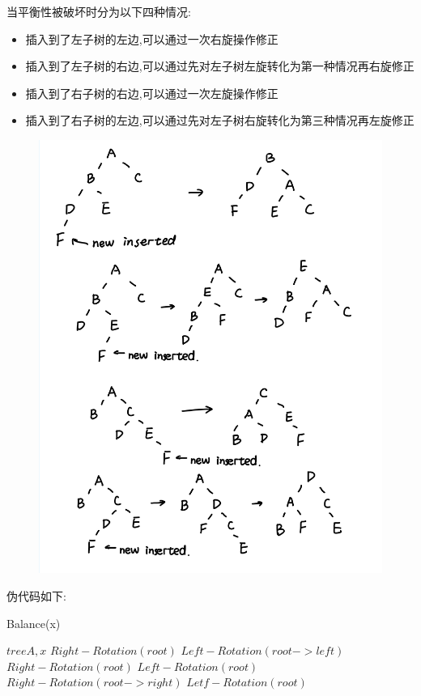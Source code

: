 \documentclass[12pt,a4paper,fontset=none]{ctexart}
\begin{document}
当平衡性被破坏时分为以下四种情况:
\begin{itemize}
	\item 插入到了左子树的左边,可以通过一次右旋操作修正
	\item 插入到了左子树的右边,可以通过先对左子树左旋转化为第一种情况再右旋修正
	\item 插入到了右子树的右边,可以通过一次左旋操作修正
	\item 插入到了右子树的左边,可以通过先对左子树右旋转化为第三种情况再左旋修正
\end{itemize}
\begin{figure}[H]
	\centering
	\includegraphics[width=0.7\linewidth]{5题图.png}
\end{figure}
伪代码如下:
\begin{algorithm}
	\renewcommand{\algorithmicensure}{\textbf{Output:}}
	\renewcommand{\algorithmicrequire}{\textbf{Input:}}
	\caption{Balance(x)}
	\label{alg4}
	\begin{algorithmic}
		\Require $tree A,x$
		\State $Right-Rotation(root)$
		\Else {}\State $Left-Rotation(root->left)$
		\State $Right-Rotation(root)$
		\EndIf
		\EndIf
		\Else {}
		\State $Left-Rotation(root)$
		\Else {}\State $Right-Rotation(root->right)$
		\State $Letf-Rotation(root)$
		\EndIf
		\EndIf
		\EndIf
		\EndFunction
	\end{algorithmic}
\end{algorithm}
\end{document}
